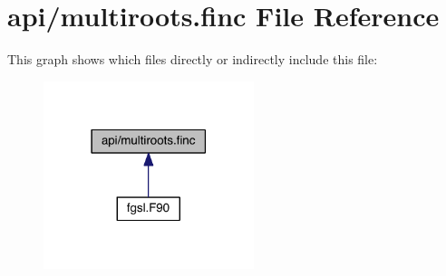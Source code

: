 \hypertarget{multiroots_8finc}{\section{api/multiroots.finc File Reference}
\label{multiroots_8finc}
}
This graph shows which files directly or indirectly include this file\-:
\nopagebreak
\begin{figure}[H]
\begin{center}
\leavevmode
\includegraphics[width=174pt]{multiroots_8finc__dep__incl}
\end{center}
\end{figure}
